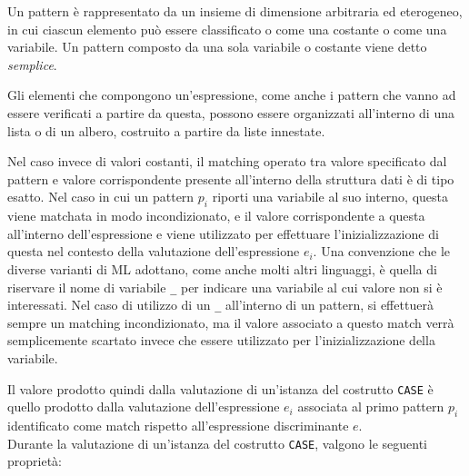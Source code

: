Un pattern è rappresentato da un insieme di dimensione arbitraria ed eterogeneo,
in cui ciascun elemento può essere classificato o come una costante o come una
variabile. Un pattern composto da una sola variabile o costante viene detto
\textit{semplice}.

Gli elementi che compongono un'espressione, come anche i pattern che vanno ad
essere verificati a partire da questa, possono essere organizzati all’interno di
una lista o di un albero, costruito a partire da liste innestate.

Nel caso invece di valori costanti, il matching operato tra valore specificato
dal pattern e valore corrispondente presente all'interno della struttura dati è
di tipo esatto. Nel caso in cui un pattern $p_i$ riporti una variabile al suo
interno, questa viene matchata in modo incondizionato, e il valore
corrispondente a questa all’interno dell’espressione e viene utilizzato per
effettuare l’inizializzazione di questa nel contesto della valutazione
dell'espressione $e_i$. Una convenzione che le diverse varianti di ML adottano,
come anche molti altri linguaggi, è quella di riservare il nome di variabile
\texttt{\_} per indicare una variabile al cui valore non si è interessati. Nel
caso di utilizzo di un \texttt{\_} all’interno di un pattern, si effettuerà
sempre un matching incondizionato, ma il valore associato a questo match verrà
semplicemente scartato invece che essere utilizzato per l’inizializzazione della
variabile.

Il valore prodotto quindi dalla valutazione di un'istanza del costrutto
\texttt{CASE} è quello prodotto dalla valutazione dell’espressione $e_i$
associata al primo pattern $p_i$ identificato come match rispetto
all’espressione discriminante $e$.\\

Durante la valutazione di un'istanza del costrutto \texttt{CASE}, valgono le
seguenti proprietà:

